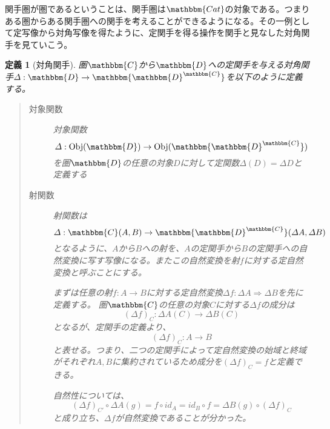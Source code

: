 \documentclass[uplatex,dvipdfmx]{jsarticle}
\newcommand{\cat}[1]{\mathbbm{#1}}
\newcommand{\arrow}{\rightarrow}
\newcommand{\functor}[3]{#1:\cat{#2}\arrow \cat{#3}}
\newcommand{\nat}[3]{#1:#2\Rightarrow #3}
\newcommand{\obj}[1]{\mathrm{Obj}(\cat{#1})}
\newcommand{\mor}[3]{#1:#2\arrow #3}
\newcommand{\arset}[3]{\cat{#1}(#2,#3)}
\newcommand{\funccat}[2]{\cat{#2}^\cat{#1}}
\newtheorem{define}{定義}[section]
\numberwithin{proof}{subsection}
\numberwithin{prop}{subsection}
\numberwithin{define}{subsection}
\begin{document}
  関手圏が圏であるということは、関手圏は$\cat{Cat}$の対象である。つまりある圏からある関手圏への関手を考えることができるようになる。その一例として定写像から対角写像を得たように、定関手を得る操作を関手と見なした対角関手を見ていこう。\\
  \begin{define}[対角関手]
    圏$\cat{C}$から$\cat{D}$への定関手を与える対角関手$\functor{\varDelta}{D}{\funccat{C}{D}}$を以下のように定義する。
    \begin{quote}
			\begin{description}
				\item[対象関数] 対象関数\[\mor{\varDelta}{\obj{D}}{\obj{\funccat{C}{D}}}\]
				を圏$\cat{D}$の任意の対象$D$に対して定関数$\varDelta(D)=\varDelta D$と定義する 
				\item[射関数] 
        射関数は\[\mor{\varDelta}{\arset{C}{A}{B}}{\arset{\funccat{C}{D}}{\varDelta A}{\varDelta B}}\]となるように、$A$から$B$への射を、$A$の定関手から$B$の定関手への自然変換に写す写像になる。またこの自然変換を射$f$に対する定自然変換と呼ぶことにする。

        まずは任意の射$\mor{f}{A}{B}$に対する定自然変換$\nat{\varDelta f}{\varDelta A}{\varDelta B}$を先に定義する。
        圏$\cat{C}$の任意の対象$C$に対する$\varDelta f$の成分は\[\mor{(\varDelta f)_C}{\varDelta A(C)}{\varDelta B(C)}\]となるが、定関手の定義より、\[\mor{(\varDelta f)_C}{A}{B}\]と表せる。つまり、二つの定関手によって定自然変換の始域と終域がそれぞれ$A,B$に集約されているため成分を$(\varDelta f)_C=f$と定義できる。

        自然性については、\[(\varDelta f)_{C'}\circ\varDelta A(g)=f\circ id_A=id_B\circ f=\varDelta B(g)\circ(\varDelta f)_C\]と成り立ち、$\varDelta f$が自然変換であることが分かった。

        \begin{center}
\end{center}
\end{description}
\end{quote}
\end{define}
\end{document}
